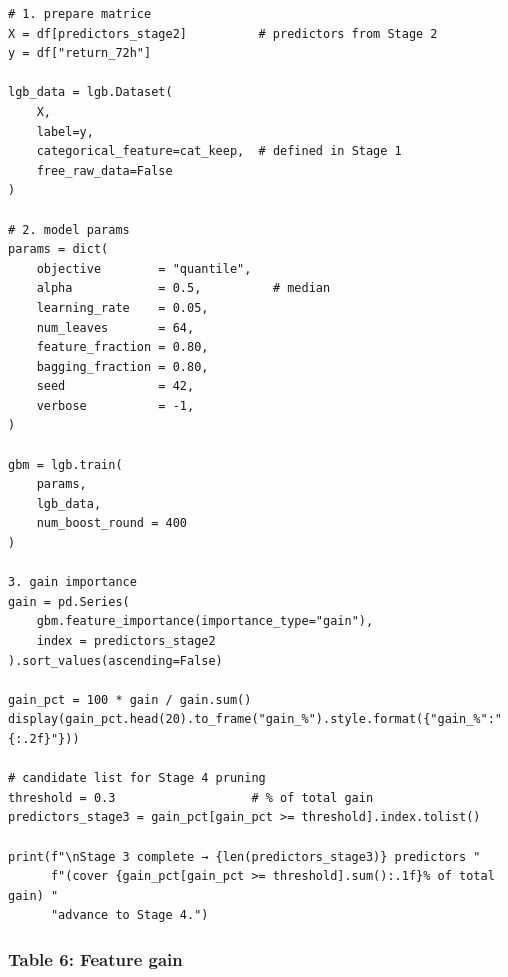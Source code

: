 \documentclass[
  a4paper,
  DIV=11,
  numbers=noendperiod]{scrreprt}
\begin{document}
\begin{verbatim}
# 1. prepare matrice
X = df[predictors_stage2]          # predictors from Stage 2
y = df["return_72h"]

lgb_data = lgb.Dataset(
    X,
    label=y,
    categorical_feature=cat_keep,  # defined in Stage 1
    free_raw_data=False
)

# 2. model params 
params = dict(
    objective        = "quantile",
    alpha            = 0.5,          # median
    learning_rate    = 0.05,
    num_leaves       = 64,
    feature_fraction = 0.80,
    bagging_fraction = 0.80,
    seed             = 42,
    verbose          = -1,
)

gbm = lgb.train(
    params,
    lgb_data,
    num_boost_round = 400
)

3. gain importance 
gain = pd.Series(
    gbm.feature_importance(importance_type="gain"),
    index = predictors_stage2
).sort_values(ascending=False)

gain_pct = 100 * gain / gain.sum()
display(gain_pct.head(20).to_frame("gain_%").style.format({"gain_%":"{:.2f}"}))

# candidate list for Stage 4 pruning
threshold = 0.3                   # % of total gain
predictors_stage3 = gain_pct[gain_pct >= threshold].index.tolist()

print(f"\nStage 3 complete → {len(predictors_stage3)} predictors "
      f"(cover {gain_pct[gain_pct >= threshold].sum():.1f}% of total gain) "
      "advance to Stage 4.")
\end{verbatim}

\subsubsection{Table 6: Feature gain}\label{table-6-feature-gain}
\end{document}
